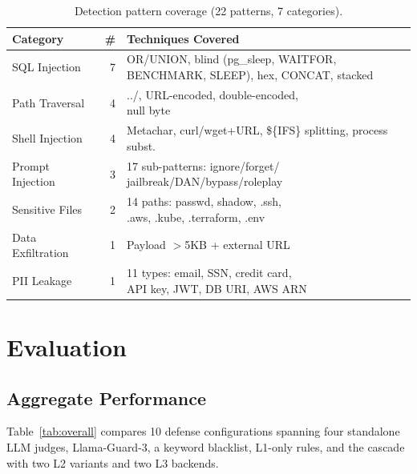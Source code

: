 \documentclass[sigconf]{acmart}
\begin{document}
\begin{table}[t]
\centering
\footnotesize
\caption{Detection pattern coverage (22 patterns, 7 categories).}
\vspace{-0.1in}
\label{tab:patterns}
\setlength{\tabcolsep}{2.5pt}
\begin{tabular}{lrl}
\toprule
\textbf{Category} & \textbf{\#} & \textbf{Techniques Covered} \\
\midrule
SQL Injection       & 7 & \makecell[tl]{OR/UNION, blind (pg\_sleep, WAITFOR,\\BENCHMARK, SLEEP), hex, CONCAT, stacked} \\
Path Traversal      & 4 & \makecell[tl]{../, URL-encoded, double-encoded,\\null byte} \\
Shell Injection     & 4 & \makecell[tl]{Metachar, curl/wget+URL,\\\$\{IFS\} splitting, process subst.} \\
Prompt Injection    & 3 & \makecell[tl]{17 sub-patterns: ignore/forget/\\jailbreak/DAN/bypass/roleplay} \\
Sensitive Files     & 2 & \makecell[tl]{14 paths: passwd, shadow, .ssh,\\.aws, .kube, .terraform, .env} \\
Data Exfiltration   & 1 & Payload $>$5KB + external URL \\
PII Leakage         & 1 & \makecell[tl]{11 types: email, SSN, credit card,\\API key, JWT, DB URI, AWS ARN} \\
\bottomrule
\end{tabular}
\vspace{-0.15in}
\end{table}

\section{Evaluation}
\label{sec:eval}

\subsection{Aggregate Performance}

Table~\ref{tab:overall} compares 10 defense configurations spanning four standalone LLM judges, Llama-Guard-3, a keyword blacklist, L1-only rules, and the cascade with two L2 variants and two L3 backends.
\end{document}
